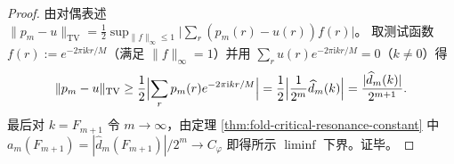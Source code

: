 \begin{proof}
由对偶表述
\(
\|p_m-u\|_{\mathrm{TV}}
=\frac12\sup_{\|f\|_\infty\le 1}\bigl|\sum_r(p_m(r)-u(r))f(r)\bigr|
\)。
取测试函数 \(f(r):=e^{-2\pi \mathrm{i}kr/M}\)（满足 \(\|f\|_\infty=1\)）并用 \(\sum_r u(r)e^{-2\pi \mathrm{i}kr/M}=0\)（\(k\ne 0\)）得
\[
\|p_m-u\|_{\mathrm{TV}}
\ge \frac12\Bigl|\sum_r p_m(r)e^{-2\pi \mathrm{i}kr/M}\Bigr|
=\frac12\Bigl|\frac{1}{2^m}\widehat d_m(k)\Bigr|
=\frac{|\widehat d_m(k)|}{2^{m+1}}.
\]
最后对 \(k=F_{m+1}\) 令 \(m\to\infty\)，由定理 \ref{thm:fold-critical-resonance-constant} 中
\(
a_m(F_{m+1})=|\widehat d_m(F_{m+1})|/2^m\to C_\varphi
\)
即得所示 \(\liminf\) 下界。证毕。
\end{proof}

\endinput
